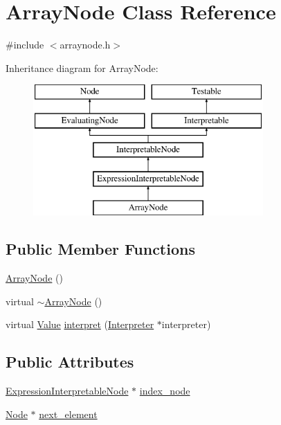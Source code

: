 \hypertarget{classArrayNode}{}\section{Array\+Node Class Reference}
\label{classArrayNode}


{\ttfamily \#include $<$arraynode.\+h$>$}

Inheritance diagram for Array\+Node\+:\begin{figure}[H]
\begin{center}
\leavevmode
\includegraphics[height=5.000000cm]{classArrayNode}
\end{center}
\end{figure}
\subsection*{Public Member Functions}
\begin{DoxyCompactItemize}
\item 
\hyperlink{classArrayNode_adfb4eb2c05953007bb2af001141a2109}{Array\+Node} ()
\item 
virtual \hyperlink{classArrayNode_aa45e4fbc84eab2f8731feefdc99bd639}{$\sim$\+Array\+Node} ()
\item 
virtual \hyperlink{classValue}{Value} \hyperlink{classArrayNode_a029220b946233e22cb661fcfac9634d0}{interpret} (\hyperlink{classInterpreter}{Interpreter} $\ast$interpreter)
\end{DoxyCompactItemize}
\subsection*{Public Attributes}
\begin{DoxyCompactItemize}
\item 
\hyperlink{classExpressionInterpretableNode}{Expression\+Interpretable\+Node} $\ast$ \hyperlink{classArrayNode_a949140f67149544aec59044dcae07036}{index\+\_\+node}
\item 
\hyperlink{classNode}{Node} $\ast$ \hyperlink{classArrayNode_aa3bccfaecfe5597fd494ee56cae918dd}{next\+\_\+element}
\end{DoxyCompactItemize}
